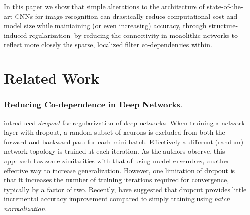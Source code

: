 \documentclass[thesis]{subfiles}
\begin{document}
	
	In this paper we show that simple alterations to the architecture of state-of-the-art CNNs for image recognition can drastically reduce computational cost and model size while maintaining (or even increasing) accuracy, through structure-induced regularization, by reducing the connectivity in monolithic networks to reflect more closely the sparse, localized filter co-dependencies within.
	
	\section{Related Work}
	\label{previouswork}
	
	
	\subsubsection{Reducing Co-dependence in Deep Networks.}
	\label{regularization}
	\citet{Hinton2012} introduced {\em dropout} for regularization of deep networks. When training a network layer with dropout, a random subset of neurons is excluded from both the forward and backward pass for each mini-batch. Effectively a different (random) network topology is trained at each iteration. As the authors observe, this approach has some similarities with that of using model ensembles, another effective way to increase generalization. However, one limitation of dropout is that it increases the number of training iterations required for convergence, typically by a factor of two. Recently, \citet{Szegedy2014going} have suggested that dropout provides little incremental accuracy improvement compared to simply training using {\em batch normalization}. 
	
\end{document}
